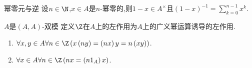 \begin{proposition}{幂零元与逆}{}
	设$n\in\N$,$x\in A$是$n$-幂零的,则$1-x\in A^{\times}$且$\left(1-x\right)^{-1}=\sum\limits_{k=0}^{n-1}x^{k}$.
\end{proposition}

\begin{proposition}{$A$是$\left(A,A\right)$-双模}{}
	定义$\Z$在$A$上的左作用为$A$上的广义幂运算诱导的左作用.
	\begin{enumerate}
		\item $\forall x,y\in A\forall n\in\Z\left(x\left(ny\right)=\left(nx\right)y=n\left(xy\right)\right)$.
		\item $\forall x\in A\forall n\in\Z\left(nx=\left(n1_{A}\right)x\right)$.
	\end{enumerate}
\end{proposition}






















































